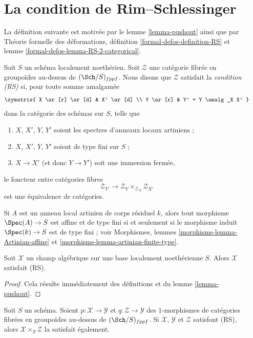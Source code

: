 \section{La condition de Rim--Schlessinger}
\label{section-RS}

\noindent
La définition suivante est motivée par le
lemme \ref{lemma-pushout}
ainsi que par
Théorie formelle des déformations, définition \ref{formal-defos-definition-RS} et
lemme \ref{formal-defos-lemma-RS-2-categorical}.

\begin{definition}
\label{definition-RS}
Soit $S$ un schéma localement noethérien. Soit $\mathcal{Z}$ une catégorie
fibrée en groupoïdes au-dessus de $(\Sch/S)_{fppf}$. Nous disons que $\mathcal{Z}$
satisfait la {\it condition (RS)} si, pour toute somme amalgamée
$$
\xymatrix{
X \ar[r] \ar[d] & X' \ar[d] \\
Y \ar[r] & Y' = Y \amalg_X X'
}
$$
dans la catégorie des schémas sur $S$, telle que
\begin{enumerate}
\item $X$, $X'$, $Y$, $Y'$ soient les spectres d'anneaux locaux artiniens ;
\item $X$, $X'$, $Y$, $Y'$ soient de type fini sur $S$ ;
\item $X \to X'$ (et donc $Y \to Y'$) soit une immersion fermée,
\end{enumerate}
le foncteur entre catégories fibres
$$
\mathcal{Z}_{Y'}
\longrightarrow
\mathcal{Z}_Y \times_{\mathcal{Z}_X} \mathcal{Z}_{X'}
$$
est une équivalence de catégories.
\end{definition}

\noindent
Si $A$ est un anneau local artinien de corps résiduel $k$, alors
tout morphisme $\Spec(A) \to S$ est affine et de type fini si et
seulement si le morphisme induit $\Spec(k) \to S$ est de type fini ; voir
Morphismes, lemmes \ref{morphisms-lemma-Artinian-affine} et
\ref{morphisms-lemma-artinian-finite-type}.

\begin{lemma}
\label{lemma-algebraic-stack-RS}
Soit $\mathcal{X}$ un champ algébrique sur une base localement noethérienne
$S$. Alors $\mathcal{X}$ satisfait (RS).
\end{lemma}

\begin{proof}
Cela résulte immédiatement des définitions et du lemme \ref{lemma-pushout}.
\end{proof}

\begin{lemma}
\label{lemma-fibre-product-RS}
Soit $S$ un schéma. Soient $p : \mathcal{X} \to \mathcal{Y}$ et
$q : \mathcal{Z} \to \mathcal{Y}$ des $1$-morphismes de catégories
fibrées en groupoïdes au-dessus de $(\Sch/S)_{fppf}$. Si $\mathcal{X}$, $\mathcal{Y}$
et $\mathcal{Z}$ satisfont (RS), alors
$\mathcal{X} \times_\mathcal{Y} \mathcal{Z}$ la satisfait également.
\end{lemma}

